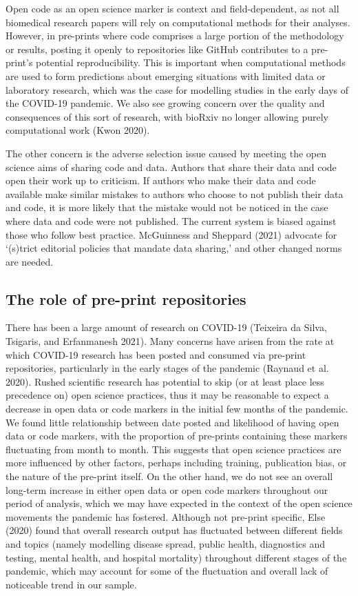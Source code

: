 \documentclass[
]{article}
\begin{document}
Open code as an open science marker is context and field-dependent, as not all biomedical research papers will rely on computational methods for their analyses. However, in pre-prints where code comprises a large portion of the methodology or results, posting it openly to repositories like GitHub contributes to a pre-print's potential reproducibility. This is important when computational methods are used to form predictions about emerging situations with limited data or laboratory research, which was the case for modelling studies in the early days of the COVID-19 pandemic. We also see growing concern over the quality and consequences of this sort of research, with bioRxiv no longer allowing purely computational work (Kwon 2020).

The other concern is the adverse selection issue caused by meeting the open science aims of sharing code and data. Authors that share their data and code open their work up to criticism. If authors who make their data and code available make similar mistakes to authors who choose to not publish their data and code, it is more likely that the mistake would not be noticed in the case where data and code were not published. The current system is biased against those who follow best practice. McGuinness and Sheppard (2021) advocate for `(s)trict editorial policies that mandate data sharing,' and other changed norms are needed.

\hypertarget{the-role-of-pre-print-repositories}{%
\subsection{The role of pre-print repositories}\label{the-role-of-pre-print-repositories}}

There has been a large amount of research on COVID-19 (Teixeira da Silva, Tsigaris, and Erfanmanesh 2021). Many concerns have arisen from the rate at which COVID-19 research has been posted and consumed via pre-print repositories, particularly in the early stages of the pandemic (Raynaud et al. 2020). Rushed scientific research has potential to skip (or at least place less precedence on) open science practices, thus it may be reasonable to expect a decrease in open data or code markers in the initial few months of the pandemic. We found little relationship between date posted and likelihood of having open data or code markers, with the proportion of pre-prints containing these markers fluctuating from month to month. This suggests that open science practices are more influenced by other factors, perhaps including training, publication bias, or the nature of the pre-print itself. On the other hand, we do not see an overall long-term increase in either open data or open code markers throughout our period of analysis, which we may have expected in the context of the open science movements the pandemic has fostered. Although not pre-print specific, Else (2020) found that overall research output has fluctuated between different fields and topics (namely modelling disease spread, public health, diagnostics and testing, mental health, and hospital mortality) throughout different stages of the pandemic, which may account for some of the fluctuation and overall lack of noticeable trend in our sample.
\end{document}
